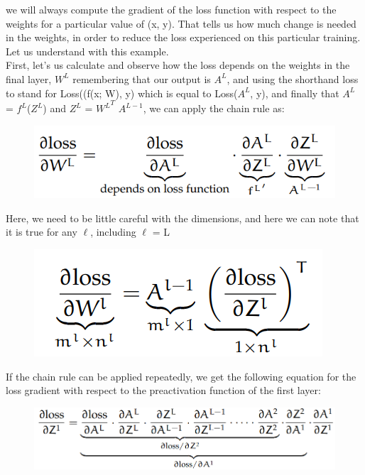 we will always compute the gradient of the loss function with respect
to the weights for a particular value of (x, y)\cite{10.5555/2968826.2968922, https://doi.org/10.48550/arxiv.1811.03378, https://doi.org/10.48550/arxiv.1506.00619}. That tells us how much change is needed in the
weights, in order to reduce the loss experienced on this particular training. Let us understand with this example.\\
First, let’s us calculate and observe how the loss depends on the weights in the final layer, $W^L$ remembering
that our output is $A^L$, and using the shorthand loss to stand for Loss((f(x; W), y) which
is equal to Loss($A^L$, y), and finally that $A^L$ = $f^L$($Z^L$) and $Z^L$ = ${W^L}^T$ $A^{L-1}$, we can apply the chain  rule as:
\begin{figure}[H]
    \centering
    \includegraphics[scale = 0.3]{Figure/ml__6.png}
    \label{fig:my_label}
\end{figure}
Here, we need to be little careful with the dimensions, and here we can note that it is true for any $ \ell$, including $ \ell$ = L\\
\begin{figure}[H]
    \centering
    \includegraphics[scale=0.3]{Figure/ml__7.png}
\end{figure}
If  the chain rule can be applied repeatedly, we get the following equation for the loss gradient  with respect to the preactivation function of the first layer:
\begin{figure}[H]
    \centering
    \includegraphics[scale=0.3]{Figure/ml__8.png}
    \label{fig:my_label}
\end{figure}


